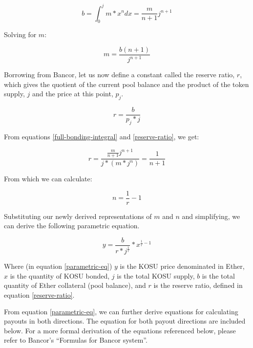 \documentclass[10pt]{article}
\begin{document}
\begin{equation}\label{full-bonding-integral}
  b = \int_{0}^{j} m*x^n dx = \frac{m}{n+1}j^{n+1}
\end{equation}
\medskip

\noindent Solving for $m$: 

\begin{equation}
  m = \frac{b(n+1)}{j^{n+1}}
\end{equation}
\medskip

Borrowing from Bancor, let us now define a constant called the reserve ratio, $r$, which gives the quotient of the current pool balance and the product of the token supply, $j$ and the price at this point, $p_j$\cite{bancor-whitepaper}.

\begin{equation}\label{reserve-ratio}
  r = \frac{b}{p_j*j}
\end{equation}
\medskip

\noindent From equations \ref{full-bonding-integral} and \ref{reserve-ratio}, we get:

\begin{equation}
  r = \frac{\frac{m}{n+1}j^{n+1}}{j*(m*j^n)} = \frac{1}{n+1}
\end{equation}
\medskip

\noindent From which we can calculate:

\begin{equation}
  n = \frac{1}{r}-1
\end{equation}
\medskip

\noindent Substituting our newly derived representations of $m$ and $n$ and simplifying, we can derive the following parametric equation.

\begin{equation}\label{parametric-eq}
  y = \frac{b}{r*j^{\frac{1}{r}}}*x^{\frac{1}{r}-1}
\end{equation}

Where (in equation \ref{parametric-eq}) $y$ is the KOSU price denominated in Ether, $x$ is the quantity of KOSU bonded, $j$ is the total KOSU supply, $b$ is the total quantity of Ether collateral (pool balance), and $r$ is the reserve ratio, defined in equation \ref{reserve-ratio}.
\medskip 

From equation \ref{parametric-eq}, we can further derive equations for calculating payouts in both directions. The equation for both payout directions are included below. For a more formal derivation of the equations referenced below, please refer to Bancor’s “Formulas for Bancor system”\cite{bancor-formulas}. 
\end{document}
